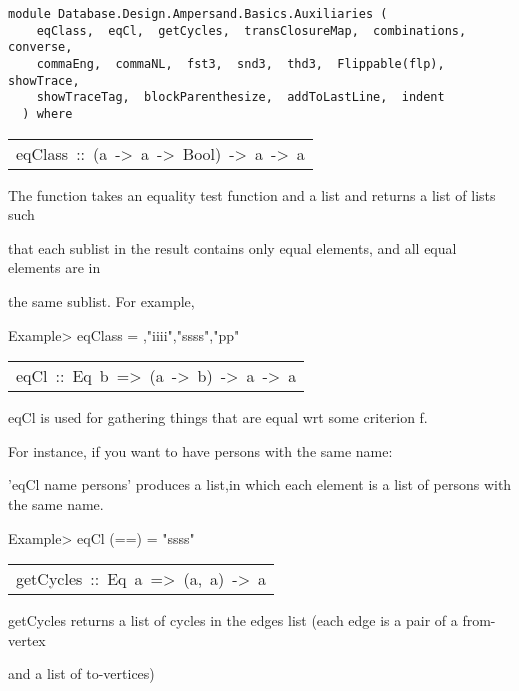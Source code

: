\label{module:Database.Design.Ampersand.Basics.Auxiliaries}
\haddockbeginheader
{\haddockverb\begin{verbatim}
module Database.Design.Ampersand.Basics.Auxiliaries (
    eqClass,  eqCl,  getCycles,  transClosureMap,  combinations,  converse, 
    commaEng,  commaNL,  fst3,  snd3,  thd3,  Flippable(flp),  showTrace, 
    showTraceTag,  blockParenthesize,  addToLastLine,  indent
  ) where\end{verbatim}}
\haddockendheader

\begin{haddockdesc}
\item[\begin{tabular}{@{}l}
eqClass\ ::\ (a\ ->\ a\ ->\ Bool)\ ->\ {\char 91}a{\char 93}\ ->\ {\char 91}{\char 91}a{\char 93}{\char 93}
\end{tabular}]\haddockbegindoc
The  function takes an equality test function and a list and returns a list of lists such

 that each sublist in the result contains only equal elements, and all equal elements are in

 the same sublist.  For example,
\par
Example> eqClass  = {},"iiii","ssss","pp"{}
\par

\end{haddockdesc}
\begin{haddockdesc}
\item[\begin{tabular}{@{}l}
eqCl\ ::\ Eq\ b\ =>\ (a\ ->\ b)\ ->\ {\char 91}a{\char 93}\ ->\ {\char 91}{\char 91}a{\char 93}{\char 93}
\end{tabular}]\haddockbegindoc
eqCl is used for gathering things that are equal wrt some criterion f.

   For instance, if you want to have persons with the same name:

    'eqCl name persons' produces a list,in which each element is a list of persons with the same name.

 Example> eqCl (==)  = "ssss"
\par

\end{haddockdesc}
\begin{haddockdesc}
\item[\begin{tabular}{@{}l}
getCycles\ ::\ Eq\ a\ =>\ {\char 91}(a,\ {\char 91}a{\char 93}){\char 93}\ ->\ {\char 91}{\char 91}a{\char 93}{\char 93}
\end{tabular}]\haddockbegindoc
getCycles returns a list of cycles in the edges list (each edge is a pair of a from-vertex

   and a list of to-vertices)
\par

\end{haddockdesc}

